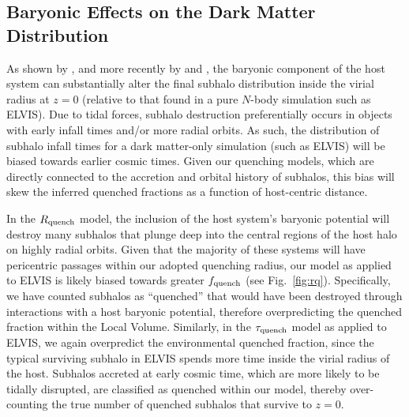 \documentclass[usenatbib]{mnras}
\begin{document}
\subsection{Baryonic Effects on the Dark Matter Distribution}
\label{subsec:DES}

As shown by \citet{donghia10}, and more recently by \citet{gk17} and
\citet{sawala17}, the baryonic component of the host system can substantially
alter the final subhalo distribution inside the virial radius at $z=0$ (relative
to that found in a pure $N$-body simulation such as ELVIS).
%
Due to tidal forces, subhalo destruction preferentially occurs in objects with
early infall times and/or more radial orbits.
%
As such, the distribution of subhalo infall times for a dark matter-only
simulation (such as ELVIS) will be biased towards earlier cosmic times.
%
Given our quenching models, which are directly connected to the accretion
and orbital history of subhalos, this bias will skew the inferred quenched
fractions as a function of host-centric distance. 

%


In the $R_{\rm quench}$ model, the inclusion of the host system's baryonic
potential will destroy many subhalos that plunge deep into the central regions
of the host halo on highly radial orbits. Given that the majority of these
systems will have pericentric passages within our adopted quenching radius, our
model as applied to ELVIS is likely biased towards greater $f_{\rm quench}$ (see
Fig.~\ref{fig:rq}).
%
Specifically, we have counted subhalos as ``quenched'' that would have been
destroyed through interactions with a host baryonic potential, therefore
overpredicting the quenched fraction within the Local Volume.
%
Similarly, in the $\tau_{\rm quench}$ model as applied to ELVIS, we again
overpredict the environmental quenched fraction, since the typical surviving
subhalo in ELVIS spends more time inside the virial radius of the host. Subhalos
accreted at early cosmic time, which are more likely to be tidally disrupted,
are classified as quenched within our model, thereby over-counting the true
number of quenched subhalos that survive to $z=0$.
%
\end{document}
